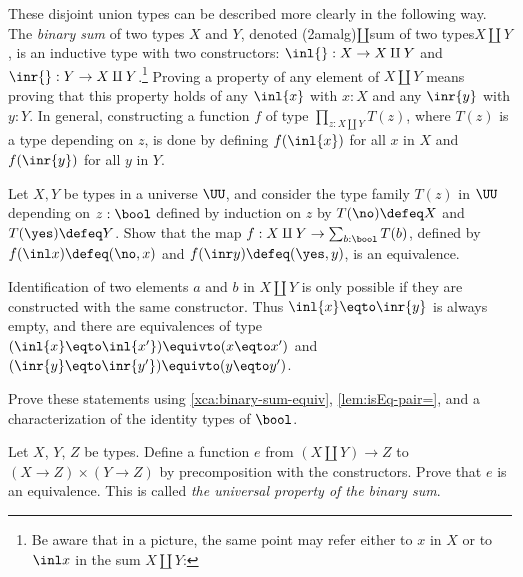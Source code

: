 These disjoint union types can be described more clearly in the following way.
The \emph{binary sum} of two types $X$ and $Y$, denoted
\glossary(2amalg){$\amalg$}{sum of two types}$X \amalg Y$,
is an inductive type with two constructors: $\inl{} : X \to X \amalg Y$ and
$\inr{} : Y \to X \amalg Y$.\footnote{%
  Be aware that in a picture, the same point may refer
  either to $x$ in $X$ or to $\inl x$ in the sum $X \amalg Y$:\par
  }
Proving a property of any element of $X \amalg Y$
means proving that this property holds of any $\inl{x}$ with $x:X$ and any
$\inr{y}$ with $y:Y$. In general, constructing a function $f$ of type
$\prod_{z: X \amalg Y} T(z)$, where $T(z)$ is a type depending on
$z$, is done by defining $f(\inl{x})$ for all $x$ in $X$
and $f(\inr{y})$ for all $y$ in $Y$.

\begin{xca}\label{xca:binary-sum-equiv}
  Let $X,Y$ be types in a universe $\UU$, and consider the type family
  $T(z)$ in $\UU$ depending on $z:\bool$ defined by induction on $z$ by
  $T(\no)\defeq X$ and $T(\yes) \defeq Y$.
  Show that the map $f : X\amalg Y \to \sum_{b:\bool}T(b)$,
  defined by $f (\inl x) \defeq (\no,x)$ and $f(\inr y) \defeq (\yes,y)$,
  is an equivalence.
\end{xca}

Identification of two elements $a$ and $b$ in $X \amalg Y$ is
only possible if they are constructed with the same constructor.
Thus $\inl{x} \eqto \inr{y}$ is always empty, and there are equivalences of type
$(\inl{x} \eqto \inl{x'}) \equivto (x \eqto x')$ and
$(\inr{y} \eqto \inr{y'}) \equivto (y \eqto y')$.

\begin{xca}\label{xca:binary-sum-id}
  Prove these statements using \cref{xca:binary-sum-equiv},
  \cref{lem:isEq-pair=}, and a characterization
  of the identity types of $\bool$.
\end{xca}

\begin{xca}\label{xca:bin-sum-univ-prop}
  Let $X$, $Y$, $Z$ be types. Define a function $e$ from
  $(X\amalg Y)\to Z$ to $(X\to Z)\times(Y\to Z)$ by precomposition
  with the constructors.
  Prove that $e$ is an equivalence.
  This is called \emph{the universal property of the binary sum}.
\end{xca}

